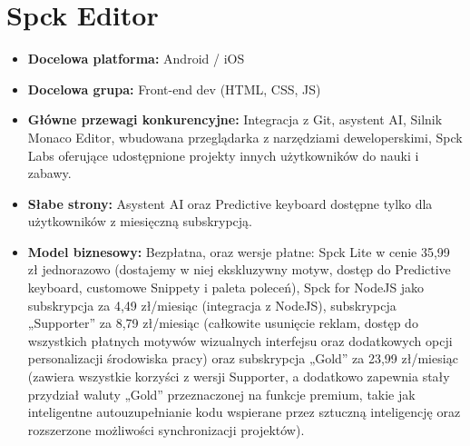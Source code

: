 \newpage
\section{Spck Editor}
\begin{itemize}
    
    \item \textbf{Docelowa platforma:} Android / iOS
    \item \textbf{Docelowa grupa:} Front-end dev (HTML, CSS, JS) 
    \item \textbf{Główne przewagi konkurencyjne:} Integracja z Git, asystent AI, Silnik Monaco Editor, wbudowana przeglądarka z narzędziami deweloperskimi, Spck Labs oferujące udostępnione projekty innych użytkowników do nauki i zabawy. 
    \item \textbf{Słabe strony:} Asystent AI oraz Predictive keyboard dostępne tylko dla użytkowników z miesięczną subskrypcją. 
    \item \textbf{Model biznesowy:} Bezpłatna, oraz wersje płatne: Spck Lite w cenie 35,99 zł jednorazowo (dostajemy w niej ekskluzywny motyw, dostęp do Predictive keyboard, customowe Snippety i paleta poleceń), Spck for NodeJS jako subskrypcja za 4,49 zł/miesiąc (integracja z NodeJS), subskrypcja „Supporter” za 8,79 zł/miesiąc (całkowite usunięcie reklam, dostęp do wszystkich płatnych motywów wizualnych interfejsu oraz dodatkowych opcji personalizacji środowiska pracy) oraz subskrypcja „Gold” za 23,99 zł/miesiąc (zawiera wszystkie korzyści z wersji Supporter, a dodatkowo zapewnia stały przydział waluty „Gold” przeznaczonej na funkcje premium, takie jak inteligentne autouzupełnianie kodu wspierane przez sztuczną inteligencję oraz rozszerzone możliwości synchronizacji projektów). 
\end{itemize}

\newpage
